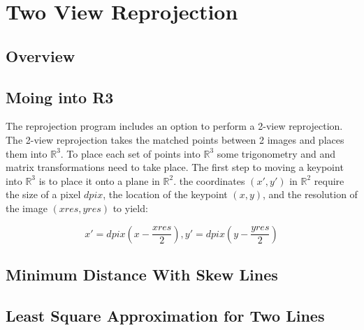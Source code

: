 \chapter{Two View Reprojection}

\section{Overview}

\section{Moing into R3}
The reprojection program includes an option to perform a 2-view reprojection.
The 2-view reprojection takes the matched points between 2 images and places them into $\mathbb{R}^{3}$.
To place each set of points into $\mathbb{R}^{3}$ some trigonometry and and matrix transformations need to take place.
The first step to moving a keypoint into $\mathbb{R}^{3}$ is to place it onto a plane in $\mathbb{R}^{2}$.
the coordinates $(x', y')$ in $\mathbb{R}^{2}$ require the size of a pixel $dpix$, the location of the keypoint $(x, y)$,
and the resolution of the image $(xres, yres)$ to yield:

\[
x' = dpix(x - \frac{xres}{2}), y' = dpix(y - \frac{yres}{2}) 
\]

\section{Minimum Distance With Skew Lines}

\section{Least Square Approximation for Two Lines}

